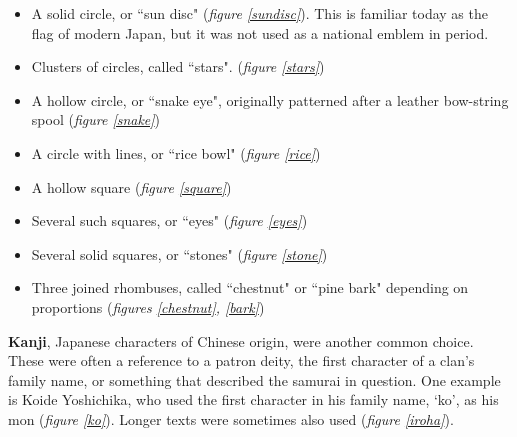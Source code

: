 \documentclass{article}
\begin{document}
\begin{multicols}{2}
\begin{itemize}
\item A solid circle, or ``sun disc" (\emph{figure
  \ref{sundisc}}).  This is familiar today as the flag of modern Japan,
  but it was not used as a national emblem in period.
\item Clusters of circles, called ``stars". (\emph{figure \ref{stars}})
\item A hollow circle, or ``snake eye", originally patterned after a leather
  bow-string spool (\emph{figure \ref{snake}})
\item A circle with lines, or ``rice bowl" (\emph{figure \ref{rice}})
\item A hollow square (\emph{figure \ref{square}})
\item Several such squares, or ``eyes" (\emph{figure \ref{eyes}})
\item Several solid squares, or ``stones" (\emph{figure \ref{stone}})
\item Three joined rhombuses, called ``chestnut" or ``pine bark" depending on proportions (\emph{figures \ref{chestnut}, \ref{bark}})
\end{itemize}
\end{multicols}

  \begin{figure}[b!]
  \begin{subfigs}
  \end{subfigs}
  \begin{subfigs}
  \end{subfigs}
  \end{figure}

\clearpage

  \textbf{Kanji}, Japanese characters of Chinese origin, were another
  common choice.  These were often a reference to a patron deity, the
  first character of a clan's family name, or something that described
  the samurai in question.  One example is Koide Yoshichika, who used
  the first character in his family name, `ko', as his mon (\emph{figure
  \ref{ko}}). Longer texts were sometimes also used
  (\emph{figure \ref{iroha}}).
\end{document}
